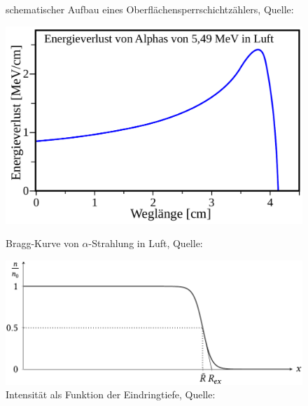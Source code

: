 \documentclass[12pt,a4paper]{scrartcl}
\numberwithin{equation}{section} %
\renewcommand{\[}{} %
\renewcommand{\]}{\noindent} %
\begin{document}
\begin{figure}[h!]
\begin{minipage}{0.45\textwidth}
		\caption{schematischer Aufbau eines Oberflächensperrschichtzählers,
			Quelle: \cite{Spektrum]}}
		\label{abb:Oberflächensperrschichtzähler}
		\vspace{1cm}
		
		\includegraphics[width=\textwidth]{../media/B3.3/Bragg-Kurve.pdf}
		\caption{Bragg-Kurve von $\alpha$-Strahlung in Luft, Quelle: \cite{Alpha Luft}}
		\label{abb:Bragg-Kurve}
	\end{minipage}
	\vspace{1cm}
	
	\begin{minipage}{0.8\textwidth}
		\includegraphics[width=\textwidth]{../media/B3.3/Reichweite.pdf}
		\caption{Intensität als Funktion der Eindringtiefe, Quelle: \cite{Uni}}
		\label{abb:Reichweite}
	\end{minipage}
\end{figure}

\clearpage
\end{document}
